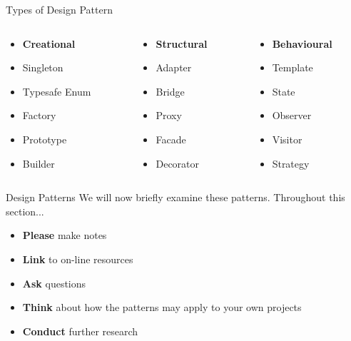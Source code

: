 \begin{frame}{Types of Design Pattern}
	\begin{columns}[onlytextwidth]
		\begin{column}{0.33\textwidth}
			\begin{itemize}
				\item \textbf{Creational}
				\item Singleton
				\item Typesafe Enum
				\item Factory
				\item Prototype
				\item Builder
			\end{itemize}
		\end{column}
		\begin{column}{0.33\textwidth}
			\begin{itemize}
				\item \textbf{Structural}
				\item Adapter
				\item Bridge
				\item Proxy
				\item Facade
				\item Decorator
			\end{itemize}
		\end{column}
		\begin{column}{0.33\textwidth}
			\begin{itemize}
				\item \textbf{Behavioural}
				\item Template
				\item State
				\item Observer
				\item Visitor				
				\item Strategy
			\end{itemize}
		\end{column}
	\end{columns}
\end{frame}

\begin{frame}{Design Patterns}
	We will now briefly examine these patterns. Throughout this section...
	
	\begin{itemize}
		\item \textbf{Please} make notes
		\item \textbf{Link} to on-line resources
		\item \textbf{Ask} questions
		\item \textbf{Think} about how the patterns may apply to your own projects
		\item \textbf{Conduct} further research
	\end{itemize}
\end{frame}


